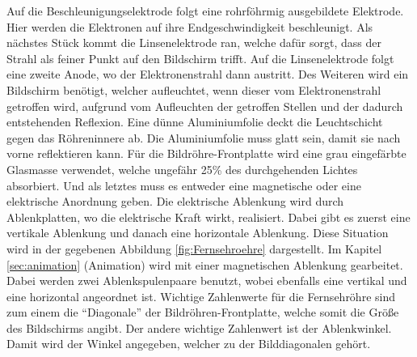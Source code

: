 Auf die Beschleunigungselektrode folgt eine rohrföhrmig ausgebildete Elektrode.
Hier werden die Elektronen auf ihre Endgeschwindigkeit beschleunigt.
Als nächstes Stück kommt die Linsenelektrode ran, welche dafür sorgt, dass der Strahl als feiner Punkt auf den Bildschirm trifft.
Auf die Linsenelektrode folgt eine zweite Anode, wo der Elektronenstrahl dann austritt.
Des Weiteren wird ein Bildschirm benötigt, welcher aufleuchtet, wenn dieser vom Elektronenstrahl getroffen wird, aufgrund vom Aufleuchten der getroffen Stellen und der dadurch entstehenden Reflexion.
Eine dünne Aluminiumfolie deckt die Leuchtschicht gegen das Röhreninnere ab.
Die Aluminiumfolie muss glatt sein, damit sie nach vorne reflektieren kann.
Für die Bildröhre-Frontplatte wird eine grau eingefärbte Glasmasse verwendet, welche ungefähr 25\% des durchgehenden Lichtes absorbiert.
Und als letztes muss es entweder eine magnetische oder eine elektrische Anordnung geben.
Die elektrische Ablenkung wird durch Ablenkplatten, wo die elektrische Kraft wirkt, realisiert.
Dabei gibt es zuerst eine vertikale Ablenkung und danach eine horizontale Ablenkung.
Diese Situation wird in der gegebenen Abbildung \ref{fig:Fernsehroehre} dargestellt.
Im Kapitel \ref{sec:animation} (Animation) wird mit einer magnetischen Ablenkung gearbeitet.
Dabei werden zwei Ablenkspulenpaare benutzt, wobei ebenfalls eine vertikal und eine horizontal angeordnet ist.
Wichtige Zahlenwerte für die Fernsehröhre sind zum einem die "`Diagonale"' der Bildröhren-Frontplatte, welche somit die Größe des Bildschirms angibt.
Der andere wichtige Zahlenwert ist der Ablenkwinkel.
Damit wird der Winkel angegeben, welcher zu der Bilddiagonalen gehört.

